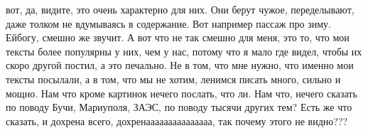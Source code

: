 






вот, да, видите, это очень характерно для них. Они берут чужое, переделывают,
даже толком не вдумываясь в содержание. Вот например пассаж про зиму. Ейбогу,
смешно же звучит. А вот что не так смешно для меня, это то, что мои тексты
более популярны у них, чем у нас, потому что я мало где видел, чтобы их скоро
другой постил, а это печально. Не в том, что мне нужно, что именно мои тексты
посылали, а в том, что мы не хотим, ленимся писать много, сильно и мощно. Нам
что кроме картинок нечего послать, что ли. Нам что, нечего сказать по поводу
Бучи, Мариуполя, ЗАЭС, по поводу тысячи других тем? Есть же что сказать, и
дохрена всего, дохренааааааааааааааа, так почему этого не видно???


